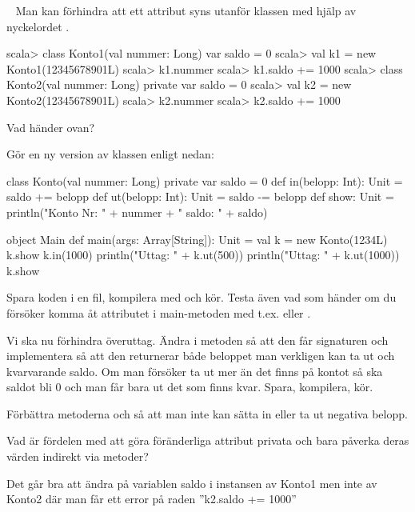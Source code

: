 \QUESTBEGIN

\Task  \what~  Man kan förhindra att ett attribut syns utanför klassen med hjälp av nyckelordet .

\begin{REPL}
scala> class Konto1(val nummer: Long){ var saldo = 0 }
scala> val k1 = new Konto1(12345678901L)
scala> k1.nummer
scala> k1.saldo += 1000
scala> class Konto2(val nummer: Long){ private var saldo = 0 }
scala> val k2 = new Konto2(12345678901L)
scala> k2.nummer
scala> k2.saldo += 1000
\end{REPL}

\Subtask Vad händer ovan?

\Subtask Gör en ny version av klassen  enligt nedan:

\begin{Code}
class Konto(val nummer: Long){
  private var saldo = 0
  def in(belopp: Int): Unit = {saldo += belopp}
  def ut(belopp: Int): Unit = {saldo -= belopp}
  def show: Unit =
    println("Konto Nr: " + nummer + " saldo: " + saldo)
}

object Main {
  def main(args: Array[String]): Unit = {
    val k = new Konto(1234L)
    k.show
    k.in(1000)
    println("Uttag: " + k.ut(500))
    println("Uttag: " + k.ut(1000))
    k.show
  }
}
\end{Code}

\Subtask Spara koden i en fil, kompilera med  och kör. Testa även vad som händer om du försöker komma åt attributet  i main-metoden med t.ex.  eller .

\Subtask Vi ska nu förhindra överuttag. Ändra i metoden  så att den får signaturen  och implementera  så att den returnerar både beloppet man verkligen kan ta ut och kvarvarande saldo. Om man försöker ta ut mer än det finns på kontot så ska saldot bli 0 och man får bara ut det som finns kvar. Spara, kompilera, kör.

\Subtask Förbättra metoderna  och  så att man inte kan sätta in eller ta ut negativa belopp.

\Subtask Vad är fördelen med att göra föränderliga attribut privata och bara påverka deras värden indirekt via metoder?

\SOLUTION


\TaskSolved \what
 

\SubtaskSolved 
Det går bra att ändra på variablen saldo i instansen av Konto1 men inte av Konto2 där man får ett error på raden ''k2.saldo += 1000''

